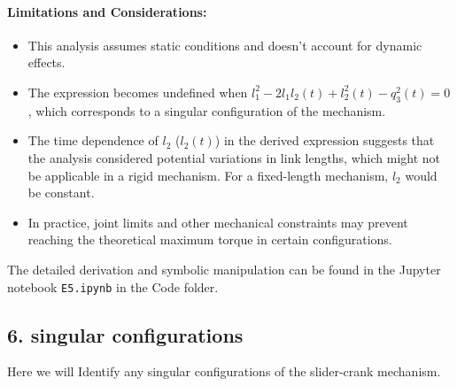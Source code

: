 \begin{solution}
\paragraph{Limitations and Considerations:}
\begin{itemize}
    \item This analysis assumes static conditions and doesn't account for dynamic effects.
    \item The expression becomes undefined when $l_1^2 - 2l_1l_2(t) + l_2^2(t) - q_3^2(t) = 0$, which corresponds to a singular configuration of the mechanism.
    \item The time dependence of $l_2$ ($l_2(t)$) in the derived expression suggests that the analysis considered potential variations in link lengths, which might not be applicable in a rigid mechanism. For a fixed-length mechanism, $l_2$ would be constant.
    \item In practice, joint limits and other mechanical constraints may prevent reaching the theoretical maximum torque in certain configurations.
\end{itemize}

The detailed derivation and symbolic manipulation can be found in the Jupyter notebook \texttt{E5.ipynb} in the Code folder.    \end{solution}
\subsection{6. singular configurations}
Here we will Identify any singular configurations of the slider-crank mechanism.

